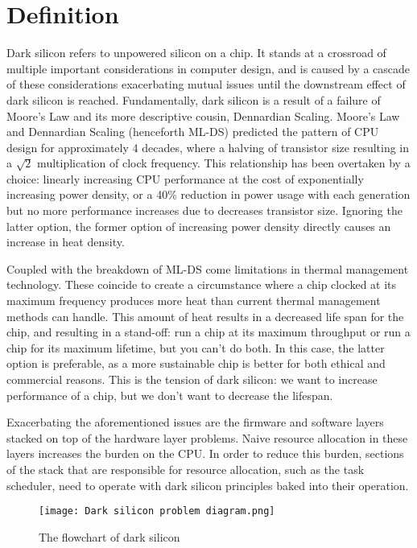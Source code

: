 

\section{Definition}
	
	Dark silicon refers to unpowered silicon on a chip. It stands at a crossroad of multiple important considerations in computer design, and is caused by a cascade of these considerations exacerbating mutual issues until the downstream effect of dark silicon is reached. 
	Fundamentally, dark silicon is a result of a failure of Moore's Law and its more descriptive cousin, Dennardian Scaling. Moore's Law and Dennardian Scaling (henceforth ML-DS) predicted the pattern of CPU design for approximately 4 decades, where a halving of transistor size resulting in a $\sqrt{2}$ multiplication of clock frequency. This relationship has been overtaken by a choice: linearly increasing CPU performance at the cost of exponentially increasing power density, or a 40\% reduction in power usage with each generation but no more performance increases due to decreases transistor size. Ignoring the latter option, the former option of increasing power density directly causes an increase in heat density.
	
	Coupled with the breakdown of ML-DS come limitations in thermal management technology. These coincide to create a circumstance where a chip clocked at its maximum frequency produces more heat than current thermal management methods can handle. This amount of heat results in a decreased life span for the chip, and resulting in a stand-off: run a chip at its maximum throughput or run a chip for its maximum lifetime, but you can't do both. In this case, the latter option is preferable, as a more sustainable chip is better for both ethical and commercial reasons. This is the tension of dark silicon: we want to increase performance of a chip, but we don't want to decrease the lifespan.
	
	Exacerbating the aforementioned issues are the firmware and software layers stacked on top of the hardware layer problems. Naive resource allocation in these layers increases the burden on the CPU. In order to reduce this burden, sections of the stack that are responsible for resource allocation, such as the task scheduler, need to operate with dark silicon principles baked into their operation. 
 

	\begin{figure}[h]
		\caption{The flowchart of dark silicon \cite{DarkSideOfSilicon}}
		\centering
		\texttt{[image: Dark silicon problem diagram.png]}
		\label{Dark silicon problem diagram}
	\end{figure}


